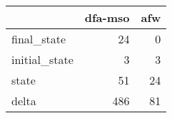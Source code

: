 \begin{tabular}{lrr}
\toprule
{} &  dfa-mso &  afw \\
\midrule
final\_state   &       24 &    0 \\
initial\_state &        3 &    3 \\
state         &       51 &   24 \\
delta         &      486 &   81 \\
\bottomrule
\end{tabular}

